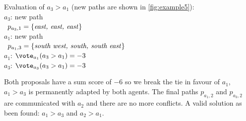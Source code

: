 \noindent Evaluation of $a_3 > a_1$ (new paths are shown in 
\autoref{fig:example5}):
\\ \-\qquad $a_3$: new path
\\ \-\qquad\quad\,\; $p_{a_3,1} = \{\text{\emph{east, east, east}}\}$
\\ \-\qquad $a_1$: new path
\\ \-\qquad\quad\,\; $p_{a_1,3} = \{\text{\emph{south west, south, south 
east}}\}$
\\ \-\qquad $a_1$: $\vote_{a_1}(a_3 > a_1) = -3$
\\ \-\qquad $a_3$: $\vote_{a_3}(a_3 > a_1) = -3$

\noindent Both proposals have a sum score of $-6$ so we break the tie in favour 
of $a_1$, 
$a_1 > 
a_3$ is permanently adapted by both agents. The final paths $p_{a_1,2}$ and 
$p_{a_3,2}$ are communicated with $a_2$ and there are no more conflicts. A 
valid solution as been found: $a_1 > a_3$ and $a_2 > a_1$.